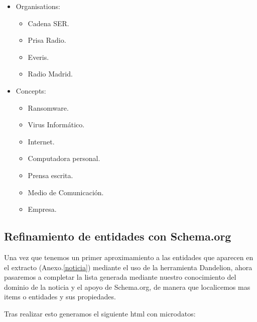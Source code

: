 \documentclass[spanish]{llncs}   %
\begin{document}
\begin{itemize}
    \item Organisations:
    \begin{itemize}
        \item Cadena SER.
        \item Prisa Radio.
        \item Everis.
        \item Radio Madrid.
    \end{itemize}
    \item Concepts:
    \begin{itemize}
        \item Ransomware.
        \item Virus Informático.
        \item Internet.
        \item Computadora personal.
        \item Prensa escrita.
        \item Medio de Comunicación.
        \item Empresa.
    \end{itemize}
\end{itemize}

\subsection{Refinamiento de entidades con Schema.org}

Una vez que tenemos un primer aproximamiento a las entidades que aparecen en el extracto 
(Anexo.\ref{noticia}) mediante el uso de la herramienta Dandelion, ahora pasaremos a completar 
la lista generada mediante nuestro conocimiento del dominio de la noticia y el apoyo de Schema.org, 
de manera que localicemos mas items o entidades y sus propiedades.

Tras realizar esto generamos el siguiente html con microdatos:


\end{document}
